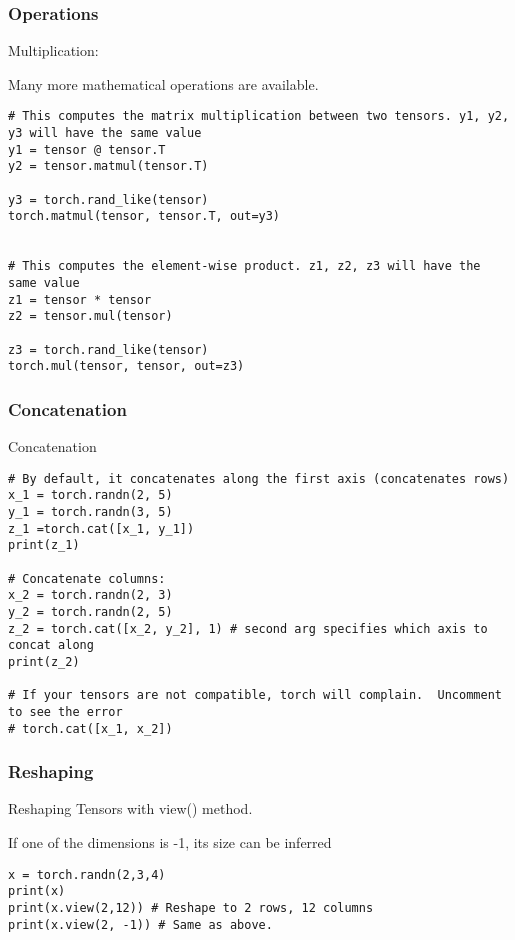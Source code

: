 \begin{frame}[fragile]
\frametitle{Operations}
Multiplication:

Many more mathematical operations are available.

\begin{lstlisting}
# This computes the matrix multiplication between two tensors. y1, y2, y3 will have the same value
y1 = tensor @ tensor.T
y2 = tensor.matmul(tensor.T)

y3 = torch.rand_like(tensor)
torch.matmul(tensor, tensor.T, out=y3)


# This computes the element-wise product. z1, z2, z3 will have the same value
z1 = tensor * tensor
z2 = tensor.mul(tensor)

z3 = torch.rand_like(tensor)
torch.mul(tensor, tensor, out=z3)
\end{lstlisting}
\end{frame} 
 
 
\begin{frame}[fragile]
\frametitle{Concatenation}
Concatenation
 \begin{lstlisting}
# By default, it concatenates along the first axis (concatenates rows)
x_1 = torch.randn(2, 5)
y_1 = torch.randn(3, 5)
z_1 =torch.cat([x_1, y_1])
print(z_1)

# Concatenate columns:
x_2 = torch.randn(2, 3)
y_2 = torch.randn(2, 5)
z_2 = torch.cat([x_2, y_2], 1) # second arg specifies which axis to concat along
print(z_2)

# If your tensors are not compatible, torch will complain.  Uncomment to see the error
# torch.cat([x_1, x_2])
\end{lstlisting}
\end{frame} 
 
\begin{frame}[fragile]
\frametitle{Reshaping}
Reshaping Tensors with view() method.

If one of the dimensions is -1, its size can be inferred

\begin{lstlisting}
x = torch.randn(2,3,4)
print(x)
print(x.view(2,12)) # Reshape to 2 rows, 12 columns
print(x.view(2, -1)) # Same as above. 
\end{lstlisting}
\end{frame} 
 
